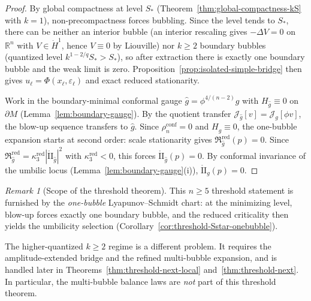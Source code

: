 \documentclass[11pt,reqno,a4paper]{amsart}
\newcommand{\R}{\mathbb{R}}
\numberwithin{equation}{section}
\theoremstyle{plain}
\theoremstyle{remark}
\newtheorem{remark}[theorem]{Remark}
\theoremstyle{plain}
\begin{document}
\begin{proof}
By global compactness at level $S_\ast$ (Theorem~\ref{thm:global-compactness-kS} with $k=1$),
non-precompactness forces bubbling. Since the level tends to $S_\ast$,
there can be neither an interior bubble (an interior rescaling gives
$-\Delta V=0$ on $\R^n$ with $V\in\dot H^1$, hence $V\equiv0$ by Liouville)
nor $k\ge2$ boundary bubbles (quantized level $k^{1-2/q}S_\ast>S_\ast$),
so after extraction there is exactly one boundary bubble and the weak limit is zero.
Proposition~\ref{prop:isolated-simple-bridge} then gives
$u_\ell=\Phi(x_\ell,\varepsilon_\ell)$ and exact reduced stationarity.

Work in the boundary-minimal conformal gauge $\hat g=\phi^{4/(n-2)}g$
with $H_{\hat g}\equiv0$ on $\partial M$ (Lemma~\ref{lem:boundary-gauge}).
By the quotient transfer $\mathcal J_{\hat g}[v]=\mathcal J_g[\phi v]$,
the blow-up sequence transfers to $\hat g$.
Since $\rho_n^{\mathrm{conf}}=0$ and $H_{\hat g}\equiv0$,
the one-bubble expansion starts at second order:
scale stationarity gives $\mathfrak R_{\hat g}^{\mathrm{red}}(p)=0$.
Since $\mathfrak R_{\hat g}^{\mathrm{red}}=\kappa_3^{\mathrm{red}}|\mathring{\mathrm{II}}_{\hat g}|^2$
with $\kappa_3^{\mathrm{red}}<0$, this forces $\mathring{\mathrm{II}}_{\hat g}(p)=0$.
By conformal invariance of the umbilic locus
(Lemma~\ref{lem:boundary-gauge}(i)), $\mathring{\mathrm{II}}_g(p)=0$.
\end{proof}

\begin{remark}[Scope of the threshold theorem]\label{rem:threshold-leading-scope}
This $n\ge5$ threshold statement is furnished by the
\emph{one-bubble} Lyapunov--Schmidt chart: at the minimizing level, blow-up
forces exactly one boundary bubble, and the reduced criticality then yields the
umbilicity selection (Corollary~\ref{cor:threshold-Sstar-onebubble}).

The higher-quantized $k\ge2$ regime is a different problem. It requires the
amplitude-extended bridge and the refined multi-bubble expansion, and is handled
later in Theorems~\ref{thm:threshold-next-local} and~\ref{thm:threshold-next}.
In particular, the multi-bubble balance laws are \emph{not} part of this
threshold theorem.
\end{remark}
\end{document}
